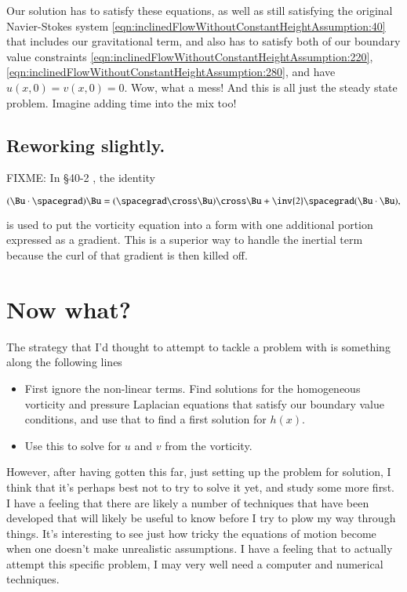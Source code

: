 Our solution has to satisfy these equations, as well as still satisfying the original Navier-Stokes system \ref{eqn:inclinedFlowWithoutConstantHeightAssumption:40} that includes our gravitational term, and also has to satisfy both of our boundary value constraints \ref{eqn:inclinedFlowWithoutConstantHeightAssumption:220}, \ref{eqn:inclinedFlowWithoutConstantHeightAssumption:280}, and have $u(x, 0) = v(x, 0) = 0$.  Wow, what a mess!  And this is all just the steady state problem.  Imagine adding time into the mix too!

\subsection{Reworking slightly.}

FIXME:
In \S 40-2 \cite{feynman1963flp:dryWater}, the identity

\begin{equation}\label{eqn:inclinedFlowWithoutConstantHeightAssumption:641}
( \Bu \cdot \spacegrad ) \Bu = 
(\spacegrad \cross \Bu) \cross \Bu
+ \inv{2} \spacegrad ( \Bu \cdot \Bu ),
\end{equation}

is used to put the vorticity equation into a form with one additional portion expressed as a gradient.  This is a superior way to handle the inertial term because the curl of that gradient is then killed off.

\section{Now what?}

The strategy that I'd thought to attempt to tackle a problem with is something along the following lines

\begin{itemize}
\item First ignore the non-linear terms.  Find solutions for the homogeneous vorticity and pressure Laplacian equations that satisfy our boundary value conditions, and use that to find a first solution for $h(x)$.
\item Use this to solve for $u$ and $v$ from the vorticity.
\end{itemize}

However, after having gotten this far, just setting up the problem for solution, I think that it's perhaps best not to try to solve it yet, and study some more first.  I have a feeling that there are likely a number of techniques that have been developed that will likely be useful to know before I try to plow my way through things.  It's interesting to see just how tricky the equations of motion become when one doesn't make unrealistic assumptions.  I have a feeling that to actually attempt this specific problem, I may very well need a computer and numerical techniques.

\EndNoBibArticle

